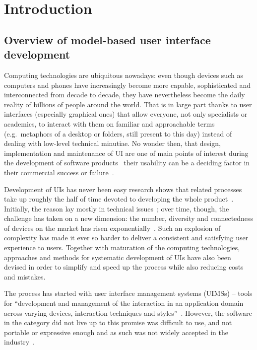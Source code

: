 \section{Introduction}\label{sec:introduction}

\subsection{Overview of model-based user interface development}\label{subsec:user-interfaces-are-important}
Computing technologies are ubiquitous nowadays: even though devices such as computers and phones have increasingly become more capable, sophisticated and interconnected from decade to decade, they have nevertheless become the daily reality of billions of people around the world.
That is in large part thanks to user interfaces (especially graphical ones) that allow everyone, not only specialists or academics, to interact with them on familiar and approachable terms (e.g.\ metaphors of a desktop or folders, still present to this day) instead of dealing with low-level technical minutiae.
No wonder then, that design, implementation and maintenance of UI are one of main points of interest during the development of software products~\cite{Anderson2010}\,\textendash\,their usability can be a deciding factor in their commercial success or failure~\cite{Offutt2002}.

Development of UIs has never been easy\,\textendash\,research shows that related processes take up roughly the half of time devoted to developing the whole product~\cite{Myers1992}.
Initially, the reason lay mostly in technical issues~\cite{Six1991};
over time, though, the challenge has taken on a new dimension:
the number, diversity and connectedness of devices on the market has risen exponentially~\cite{Cisco2020}.
Such an explosion of complexity has made it ever so harder to deliver a consistent and satisfying user experience to users.
Together with maturation of the computing technologies, approaches and methods for systematic development of UIs have also been devised in order to simplify and speed up the process while also reducing costs and mistakes.

The process has started with user interface management systems (UIMSs) – tools for \enquote{development and management of the interaction in an application domain across varying devices, interaction techniques and styles}~\cite{Betts1987}.
However, the software in the category did not live up to this promise\,\textendash\,was difficult to use, and not portable or expressive enough\,\textendash\,and as such was not widely accepted in the industry~\cite{Myers1987}.

